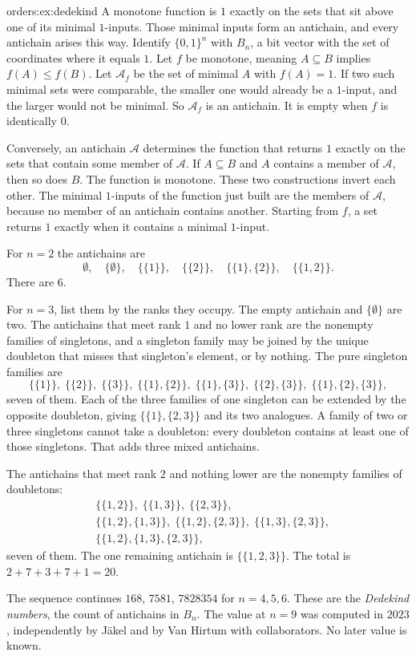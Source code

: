 \begin{solution}{orders:ex:dedekind}
\idea A monotone function is $1$ exactly on the sets that sit above one of its minimal $1$-inputs. Those minimal inputs form an antichain, and every antichain arises this way.
\writeup Identify $\{0,1\}^n$ with $B_n$, a bit vector with the set of coordinates where it equals $1$. Let $f$ be monotone, meaning $A\subseteq B$ implies $f(A)\le f(B)$. Let $\mathcal A_f$ be the set of minimal $A$ with $f(A)=1$. If two such minimal sets were comparable, the smaller one would already be a $1$-input, and the larger would not be minimal. So $\mathcal A_f$ is an antichain. It is empty when $f$ is identically $0$.

Conversely, an antichain $\mathcal A$ determines the function that returns $1$ exactly on the sets that contain some member of $\mathcal A$. If $A\subseteq B$ and $A$ contains a member of $\mathcal A$, then so does $B$. The function is monotone. These two constructions invert each other. The minimal $1$-inputs of the function just built are the members of $\mathcal A$, because no member of an antichain contains another. Starting from $f$, a set returns $1$ exactly when it contains a minimal $1$-input.

For $n=2$ the antichains are
\[
\emptyset,\quad \{\emptyset\},\quad \{\{1\}\},\quad \{\{2\}\},\quad \{\{1\},\{2\}\},\quad \{\{1,2\}\}.
\]
There are $6$.

For $n=3$, list them by the ranks they occupy. The empty antichain and $\{\emptyset\}$ are two. The antichains that meet rank $1$ and no lower rank are the nonempty families of singletons, and a singleton family may be joined by the unique doubleton that misses that singleton's element, or by nothing. The pure singleton families are
\[
\{\{1\}\},\;\{\{2\}\},\;\{\{3\}\},\;\{\{1\},\{2\}\},\;\{\{1\},\{3\}\},\;\{\{2\},\{3\}\},\;\{\{1\},\{2\},\{3\}\},
\]
seven of them. Each of the three families of one singleton can be extended by the opposite doubleton, giving $\{\{1\},\{2,3\}\}$ and its two analogues. A family of two or three singletons cannot take a doubleton: every doubleton contains at least one of those singletons. That adds three mixed antichains.

The antichains that meet rank $2$ and nothing lower are the nonempty families of doubletons:
\begin{align*}
&\{\{1,2\}\},\;\{\{1,3\}\},\;\{\{2,3\}\},\\
&\{\{1,2\},\{1,3\}\},\;\{\{1,2\},\{2,3\}\},\;\{\{1,3\},\{2,3\}\},\\
&\{\{1,2\},\{1,3\},\{2,3\}\},
\end{align*}
seven of them. The one remaining antichain is $\{\{1,2,3\}\}$. The total is $2+7+3+7+1=20$.

The sequence continues $168$, $7581$, $7828354$ for $n=4,5,6$. These are the \emph{Dedekind numbers}, the count of antichains in $B_n$. The value at $n=9$ was computed in $2023$, independently by J\"akel and by Van Hirtum with collaborators. No later value is known.
\end{solution}

